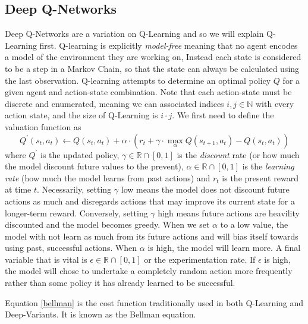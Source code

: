 \documentclass[doc, onecolumn, 12pt]{apa6}
\begin{document}
\subsection{Deep Q-Networks}
Deep Q-Networks are a variation on Q-Learning and so we will explain Q-Learning first. Q-learning is explicitly \emph{model-free} meaning that no agent encodes a model of the environment they are working on, Instead each state is considered to be a step in a Markov Chain, so that the state can always be calculated using the last observation. Q-learning attempts to determine an optimal policy $Q$ for a given agent and action-state combination. Note that each action-state must be discrete and enumerated, meaning we can associated indices $i, j \in \mathbb{N}$ with every action state, and the size of Q-Learning is $i \cdot j$. We first need to define the valuation function as 
\begin{equation} 
\label{bellman}
Q^{\prime}(s_{t}, a_{t}) \leftarrow Q(s_{t}, a_{t}) + \alpha \cdot \left( r_{t} + \gamma \cdot \max_{\alpha} Q(s_{t+1}, a_{t}) - Q(s_{t}, a_{t}) \right)
\end{equation}  where $Q^{\prime}$ is the updated policy, $\gamma \in \mathbb{R} \cap [0,1]$ is the \emph{discount} rate (or how much the model discount future values to the prevent), $\alpha \in \mathbb{R} \cap [0,1]$ is the \emph{learning rate} (how much the model learns from past actions) and $r_{t}$ is the present reward at time $t$.  Necessarily, setting $\gamma$ low means the model does not discount future actions as much and disregards actions that may improve its current state for a longer-term reward. Conversely, setting $\gamma$ high means future actions are heavility discounted and the model becomes greedy. When we set $\alpha$ to a low value, the model with not learn as much from its future actions and will bias itself towards using past, successful actions. When $\alpha$ is high, the model will learn more. A final variable that is vital is $\epsilon \in \mathbb{R} \cap [0,1]$ or the experimentation rate. If $\epsilon$ is high, the model will chose to undertake a completely random action more frequently rather than some policy it has already learned to be successful. 

Equation \ref{bellman} is the cost function traditionally used in both Q-Learning and Deep-Variants. It is known as the Bellman equation. 
\end{document}
